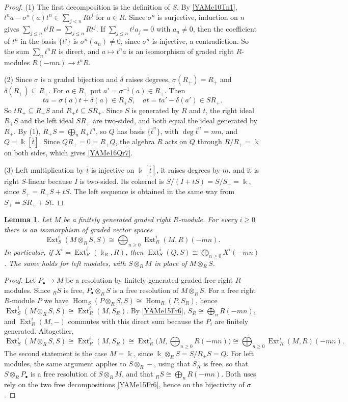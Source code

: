 \documentclass[reqno]{amsart}
\numberwithin{equation}{section}
\newtheorem{lemma}[equation]{Lemma}
\theoremstyle{definition}
\theoremstyle{remark}
\theoremstyle{plain}
\newcommand{\kk}{\Bbbk}
\DeclareMathOperator{\Ext}{Ext}
\DeclareMathOperator{\Hom}{Hom}
\begin{document}
\begin{proof}
(1) The first decomposition is the definition of $S$. By \eqref{YAMe10Tn1}, $t^na-\sigma^n(a)t^n\in\sum_{j<n}Rt^j$ for $a\in R$. Since $\sigma^n$ is surjective, induction on $n$ gives $\sum_{j\le n}t^jR=\sum_{j\le n}Rt^j$. If $\sum_{j\le n}t^ja_j=0$ with $a_n\neq0$, then the coefficient of $t^n$ in the basis $\{t^j\}$ is $\sigma^n(a_n)\neq0$, since $\sigma^n$ is injective, a contradiction. So the sum $\sum_nt^nR$ is direct, and $a\mapsto t^na$ is an isomorphism of graded right $R$-modules $R(-mn)\to t^nR$.

(2) Since $\sigma$ is a graded bijection and $\delta$ raises degrees, $\sigma(R_+)=R_+$ and $\delta(R_+)\subseteq R_+$. For $a\in R_+$ put $a'=\sigma^{-1}(a)\in R_+$. Then
\[
ta=\sigma(a)t+\delta(a)\in R_+S,\quad at=ta'-\delta(a')\in SR_+.
\]
So $tR_+\subseteq R_+S$ and $R_+t\subseteq SR_+$. Since $S$ is generated by $R$ and $t$, the right ideal $R_+S$ and the left ideal $SR_+$ are two-sided, and both equal the ideal generated by $R_+$. By (1), $R_+S=\bigoplus_nR_+t^n$, so $Q$ has basis $\{\bar t^n\}$, with $\deg\bar t^n=mn$, and $Q=\kk[\bar t]$. Since $QR_+=0=R_+Q$, the algebra $R$ acts on $Q$ through $R/R_+=\kk$ on both sides, which gives \eqref{YAMe16Qr7}.

(3) Left multiplication by $\bar t$ is injective on $\kk[\bar t]$, it raises degrees by $m$, and it is right $S$-linear because $I$ is two-sided. Its cokernel is $S/(I+tS)=S/S_+=\kk$, since $S_+=R_+S+tS$. The left sequence is obtained in the same way from $S_+=SR_++St$.
\end{proof}

\begin{lemma}\label{YAMl8Mb3}
Let $M$ be a finitely generated graded right $R$-module. For every $i\ge0$ there is an isomorphism of graded vector spaces
\[
\Ext^i_S(M\otimes_RS,S)\cong\bigoplus_{n\ge0}\Ext^i_R(M,R)(-mn).
\]
In particular, if $X^i=\Ext^i_R(\kk_R,R)$, then $\Ext^i_S(Q,S)\cong\bigoplus_{n\ge0}X^i(-mn)$. The same holds for left modules, with $S\otimes_RM$ in place of $M\otimes_RS$.
\end{lemma}

\begin{proof}
Let $P_\bullet\to M$ be a resolution by finitely generated graded free right $R$-modules. Since ${}_RS$ is free, $P_\bullet\otimes_RS$ is a free resolution of $M\otimes_RS$. For a free right $R$-module $P$ we have $\Hom_S(P\otimes_RS,S)\cong\Hom_R(P,S_R)$, hence $\Ext^i_S(M\otimes_RS,S)\cong\Ext^i_R(M,S_R)$. By \eqref{YAMe15Fr6}, $S_R\cong\bigoplus_nR(-mn)$, and $\Ext^i_R(M,-)$ commutes with this direct sum because the $P_i$ are finitely generated. Altogether,
\[
\Ext^i_S(M\otimes_RS,S)\cong\Ext^i_R(M,S_R)\cong\Ext^i_R\Big(M,\bigoplus_{n\ge0}R(-mn)\Big)\cong\bigoplus_{n\ge0}\Ext^i_R(M,R)(-mn).
\]
The second statement is the case $M=\kk$, since $\kk\otimes_RS=S/R_+S=Q$. For left modules, the same argument applies to $S\otimes_R-$, using that $S_R$ is free, so that $S\otimes_RP_\bullet$ is a free resolution of $S\otimes_RM$, and that ${}_RS\cong\bigoplus_nR(-mn)$. Both uses rely on the two free decompositions \eqref{YAMe15Fr6}, hence on the bijectivity of $\sigma$.
\end{proof}
\end{document}
